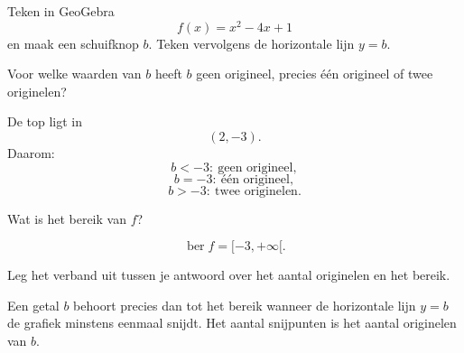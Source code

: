 \documentclass{ximera}
\begin{document}
\begin{oefening}{\oefU\ESS}

Teken in GeoGebra
\[
f(x)=x^2-4x+1
\]
en maak een schuifknop \(b\). Teken vervolgens de horizontale lijn \(y=b\).

\begin{question}
Voor welke waarden van \(b\) heeft \(b\) geen origineel, precies één origineel
of twee originelen?

\begin{oplossing}
De top ligt in
\[
(2,-3).
\]
Daarom:
\[
b<-3:\ \text{geen origineel},
\]
\[
b=-3:\ \text{één origineel},
\]
\[
b>-3:\ \text{twee originelen}.
\]
\end{oplossing}
\end{question}

\begin{question}
Wat is het bereik van \(f\)?

\begin{oplossing}
\[
\operatorname{ber}f=[-3,+\infty[.
\]
\end{oplossing}
\end{question}

\begin{question}
Leg het verband uit tussen je antwoord over het aantal originelen en het bereik.

\begin{oplossing}
Een getal \(b\) behoort precies dan tot het bereik wanneer de horizontale lijn
\(y=b\) de grafiek minstens eenmaal snijdt. Het aantal snijpunten is het aantal
originelen van \(b\).
\end{oplossing}
\end{question}

\end{oefening}
\end{document}
